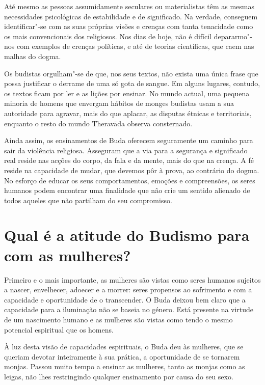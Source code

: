 Até mesmo as pessoas assumidamente seculares ou materialistas têm as
mesmas necessidades psicológicas de estabilidade e de significado. Na
verdade, conseguem identificar"-se com as suas próprias visões e crenças
com tanta tenacidade como os mais convencionais dos religiosos. Nos dias
de hoje, não é difícil depararmo"-nos com exemplos de crenças políticas,
e até de teorias científicas, que caem nas malhas do dogma.

Os budistas orgulham"-se de que, nos seus textos, não exista uma única
frase que possa justificar o derrame de uma só gota de sangue. Em alguns
lugares, contudo, os textos ficam por ler e as lições por ensinar. No
mundo actual, uma pequena minoria de homens que envergam hábitos de
monges budistas usam a sua autoridade para agravar, mais do que aplacar,
as disputas étnicas e territoriais, enquanto o resto do mundo Theravāda
observa consternado.

Ainda assim, os ensinamentos de Buda oferecem seguramente um caminho
para sair da violência religiosa. Asseguram que a via para a segurança e
significado real reside nas acções do corpo, da fala e da mente, mais do
que na crença. A fé reside na capacidade de mudar, que devemos pôr à
prova, ao contrário do dogma. No esforço de educar os seus
comportamentos, emoções e compreensões, os seres humanos podem encontrar
uma finalidade que não crie um sentido alienado de todos aqueles que não
partilham do seu compromisso.

\section{Qual é a atitude do Budismo para com as mulheres?}

Primeiro e o mais importante, as mulheres são vistas como seres humanos
sujeitos a nascer, envelhecer, adoecer e a morrer: seres propensos ao
sofrimento e com a capacidade e oportunidade de o transcender. O Buda
deixou bem claro que a capacidade para a iluminação não se baseia no
género. Está presente na virtude de um nascimento humano e as mulheres
são vistas como tendo o mesmo potencial espiritual que os homens.

À luz desta visão de capacidades espirituais, o Buda deu às mulheres,
que se queriam devotar inteiramente à sua prática, a oportunidade de se
tornarem monjas. Passou muito tempo a ensinar as mulheres, tanto as
monjas como as leigas, não lhes restringindo qualquer ensinamento por
causa do seu sexo.

